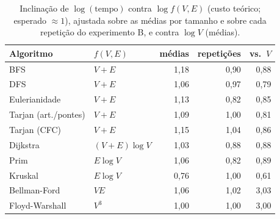 \begin{table}[t]
\caption{Inclinação de $\log(\text{tempo})$ contra $\log f(V,E)$ (custo teórico; esperado $\approx 1$), ajustada sobre as médias por tamanho e sobre cada repetição do experimento B, e contra $\log V$ (médias).}
\label{tab:p2exp}
\footnotesize
\begin{tabular}{@{}llrrr@{}}
\toprule
Algoritmo & $f(V,E)$ & médias & repetições & vs.\ $V$ \\
\midrule
BFS & $V+E$ & 1{,}18 & 0{,}90 & 0{,}88 \\
DFS & $V+E$ & 1{,}06 & 0{,}97 & 0{,}79 \\
Eulerianidade & $V+E$ & 1{,}13 & 0{,}82 & 0{,}85 \\
Tarjan (art./pontes) & $V+E$ & 1{,}09 & 1{,}00 & 0{,}81 \\
Tarjan (CFC) & $V+E$ & 1{,}15 & 1{,}04 & 0{,}86 \\
Dijkstra & $(V+E)\log V$ & 1{,}03 & 0{,}88 & 0{,}88 \\
Prim & $E\log V$ & 1{,}06 & 0{,}82 & 0{,}89 \\
Kruskal & $E\log V$ & 0{,}76 & 1{,}00 & 0{,}61 \\
Bellman-Ford & $VE$ & 1{,}06 & 1{,}02 & 3{,}03 \\
Floyd-Warshall & $V^3$ & 1{,}00 & 1{,}00 & 3{,}00 \\
\bottomrule
\end{tabular}
\end{table}
